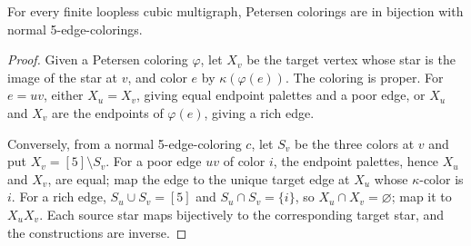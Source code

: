 \documentclass[10pt,a4paper]{amsart}
\begin{document}
\begin{proposition}\label{prop:equivalence}
For every finite loopless cubic multigraph, Petersen colorings are in
bijection with normal 5-edge-colorings.
\end{proposition}

\begin{proof}
Given a Petersen coloring \(\varphi\), let \(X_v\) be the target vertex whose
star is the image of the star at \(v\), and color \(e\) by
\(\kappa(\varphi(e))\).  The coloring is proper.  For \(e=uv\), either
\(X_u=X_v\), giving equal endpoint palettes and a poor edge, or \(X_u\) and
\(X_v\) are the endpoints of \(\varphi(e)\), giving a rich edge.

Conversely, from a normal 5-edge-coloring \(c\), let \(S_v\) be the three
colors at \(v\) and put \(X_v=[5]\setminus S_v\).  For a poor edge \(uv\) of
color \(i\), the endpoint palettes, hence \(X_u\) and \(X_v\), are equal; map
the edge to the unique target edge at \(X_u\) whose \(\kappa\)-color is \(i\).
For a rich edge, \(S_u\cup S_v=[5]\) and \(S_u\cap S_v=\{i\}\), so
\(X_u\cap X_v=\varnothing\); map it to \(X_uX_v\).  Each source star maps
bijectively to the corresponding target star, and the constructions are
inverse.
\end{proof}
\end{document}
